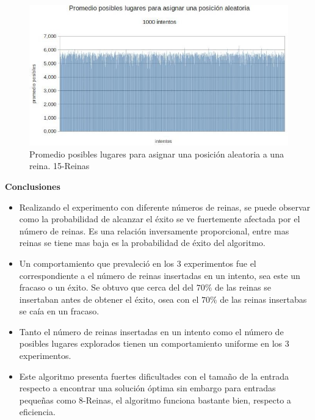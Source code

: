 \documentclass[a4paper,10pt]{article}
\begin{document}
\begin{itemize}
\begin{figure}
 \centering
 \includegraphics[scale=0.5]{posibles15.jpg}
 \caption{Promedio posibles lugares para asignar una posición aleatoria a una reina. 15-Reinas}
 \label{fig:posibles10}
\end{figure}

\end{itemize}


\textbf{Conclusiones}\\

\begin{itemize}
 \item Realizando el experimento con diferente números de reinas, se puede observar como la probabilidad de alcanzar el éxito se ve fuertemente afectada por el número de reinas. Es una
relación inversamente proporcional, entre mas reinas se tiene mas baja es la probabilidad de éxito del algoritmo.
\item Un comportamiento que prevaleció en los 3 experimentos fue el correspondiente a el número de reinas insertadas en un intento, sea este un fracaso o un éxito. Se obtuvo que cerca del
del $70\%$ de las reinas se insertaban antes de obtener el éxito, osea con el $70\%$ de las reinas insertabas se caía en un fracaso.
\item Tanto el número de reinas insertadas en un intento como el número de posibles lugares explorados tienen un comportamiento uniforme en los 3 experimentos.
\item Este algoritmo presenta fuertes dificultades con el tamaño de la entrada respecto a encontrar una solución óptima sin embargo para entradas pequeñas como 8-Reinas, el algoritmo funciona
bastante bien, respecto a eficiencia.
\end{itemize}
\end{document}

